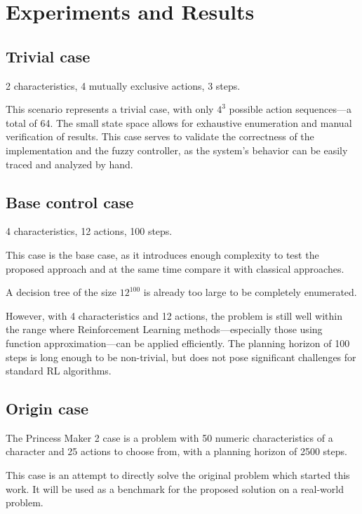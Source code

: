 \documentclass[11pt, a4paper]{article}
\begin{document}
	\section{Experiments and Results}

	\subsection{Trivial case}

	2 characteristics, 4 mutually exclusive actions, 3 steps.

	This scenario represents a trivial case, with only $4^{3}$ possible action sequences—a total of 64.
	The small state space allows for exhaustive enumeration and manual verification of results.
	This case serves to validate the correctness of the implementation and the fuzzy controller, as the system's behavior can be easily traced and analyzed by hand.

	\subsection{Base control case}
    
	4 characteristics, 12 actions, 100 steps.

	This case is the base case, as it introduces enough complexity to test the proposed approach and at the same time compare it with classical approaches.

	A decision tree of the size $12^{100}$ is already too large to be completely enumerated.

	However, with 4 characteristics and 12 actions, the problem is still well within the range where Reinforcement Learning methods—especially those using function approximation—can be applied efficiently.
	The planning horizon of 100 steps is long enough to be non-trivial, but does not pose significant challenges for standard RL algorithms.

	\subsection{Origin case}

	The Princess Maker 2 case is a problem with 50 numeric characteristics of a character and 25 actions to choose from, with a planning horizon of 2500 steps.

	This case is an attempt to directly solve the original problem which started this work.
	It will be used as a benchmark for the proposed solution on a real-world problem.
\end{document}
